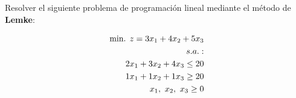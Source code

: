 Resolver el siguiente problema de programación lineal mediante el método de \textbf{Lemke}:

\begin{equation}
\begin{split}
\mbox{min. } z = 3x_1 + 4x_2 + 5x_3 \\
s.a.:\\
2x_1 + 3x_2 + 4x_3 \leq 20\\
1x_1 + 1x_2 + 1x_3 \geq 20\\
x_1,\,\,x_2,\,\,x_3\geq 0\\
\notag
\end{split}
\end{equation}

